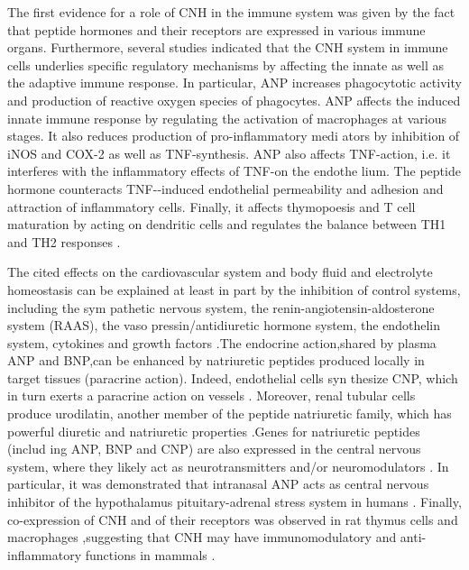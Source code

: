 \documentclass[14pt,a4paper,onecolumn]{extarticle}
\begin{document}
The first evidence for a role of CNH in the immune system was given by the fact that peptide hormones and their receptors are expressed in various immune organs. Furthermore, several studies indicated that the CNH system in immune cells underlies specific regulatory mechanisms by affecting the innate as well as the adaptive immune response. In particular, ANP increases phagocytotic activity and production of reactive oxygen species of phagocytes. ANP affects the induced innate immune response by regulating the activation of macrophages at various stages. It also reduces production of pro-inflammatory medi ators by inhibition of iNOS and COX-2 as well as TNF-\alpha synthesis. ANP also affects TNF-\alpha action, i.e. it interferes with the inflammatory effects of TNF-\alpha on the endothe lium. The peptide hormone counteracts TNF-\alpha-induced endothelial permeability and adhesion and attraction of inflammatory cells. Finally, it affects thymopoesis and T cell maturation by acting on dendritic cells and regulates the balance between TH1 and TH2 responses \citep{99}.

The cited effects on the cardiovascular system and body fluid and electrolyte homeostasis can be explained at least in part by the inhibition of control systems, including the sym pathetic nervous system, the renin-angiotensin-aldosterone system (RAAS), the vaso pressin/antidiuretic hormone system, the endothelin system, cytokines and growth factors \citep{90} \citep{91} \citep{92} \citep{93} \citep{94} \citep{95} \citep{96} \citep{97} \citep{98} \citep{99}.The endocrine action,shared by plasma ANP and BNP,can be enhanced by natriuretic peptides produced locally in target tissues (paracrine action). Indeed, endothelial cells syn thesize CNP, which in turn exerts a paracrine action on vessels \citep{57} \citep{84} \citep{85} \citep{86} \citep{87} \citep{88}. Moreover, renal tubular cells produce urodilatin, another member of the peptide natriuretic family, which has powerful diuretic and natriuretic properties \citep{100}.Genes for natriuretic peptides (includ ing ANP, BNP and CNP) are also expressed in the central nervous system, where they likely act as neurotransmitters and/or neuromodulators \citep{91} \citep{92} \citep{93} \citep{100} \citep{101} \citep{102}. In particular, it was demonstrated that intranasal ANP acts as central nervous inhibitor of the hypothalamus pituitary-adrenal stress system in humans \citep{103}. Finally, co-expression of CNH and of their receptors was observed in rat thymus cells and macrophages \citep{104} \citep{105},suggesting that CNH may have immunomodulatory and anti-inflammatory functions in mammals \citep{106}.
\end{document}
